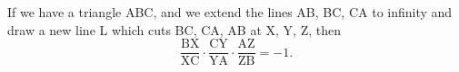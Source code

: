 If we have a triangle ABC, and we extend the lines AB, BC, CA to infinity
and draw a new line L which cuts BC, CA, AB at X, Y, Z, then 
\[ \frac{\mathrm{BX}}{\mathrm{XC}}
\cdot \frac{\mathrm{CY}}{\mathrm{YA}}
\cdot \frac{\mathrm{AZ}}{\mathrm{ZB}} = -1 . \]